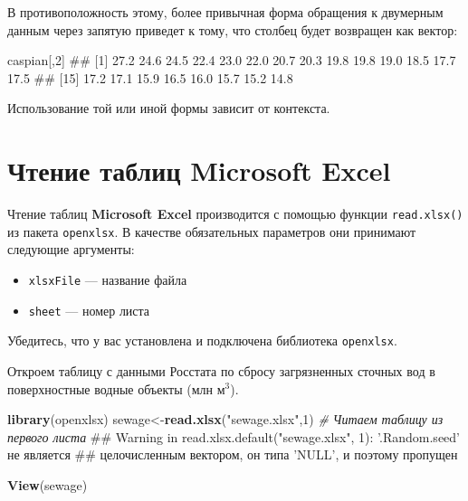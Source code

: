\documentclass[]{book}
\newenvironment{Shaded}{\begin{snugshade}}{\end{snugshade}}
\newcommand{\KeywordTok}[1]{\textcolor[rgb]{0.13,0.29,0.53}{\textbf{#1}}}
\newcommand{\DecValTok}[1]{\textcolor[rgb]{0.00,0.00,0.81}{#1}}
\newcommand{\StringTok}[1]{\textcolor[rgb]{0.31,0.60,0.02}{#1}}
\newcommand{\CommentTok}[1]{\textcolor[rgb]{0.56,0.35,0.01}{\textit{#1}}}
\newcommand{\NormalTok}[1]{#1}
\providecommand{\tightlist}{%
  \setlength{\itemsep}{0pt}\setlength{\parskip}{0pt}}
\begin{document}
В противоположность этому, более привычная форма обращения к двумерным
данным через запятую приведет к тому, что столбец будет возвращен как
вектор:

\begin{Shaded}
\begin{Highlighting}[]
\NormalTok{caspian[,}\DecValTok{2}\NormalTok{]}
\NormalTok{##  [1] 27.2 24.6 24.5 22.4 23.0 22.0 20.7 20.3 19.8 19.8 19.0 18.5 17.7 17.5}
\NormalTok{## [15] 17.2 17.1 15.9 16.5 16.0 15.7 15.2 14.8}
\end{Highlighting}
\end{Shaded}

Использование той или иной формы зависит от контекста.

\section{Чтение таблиц Microsoft Excel}\label{excel_reading}

Чтение таблиц \textbf{Microsoft Excel} производится с помощью функции
\texttt{read.xlsx()} из пакета \texttt{openxlsx}. В качестве
обязательных параметров они принимают следующие аргументы:

\begin{itemize}
\tightlist
\item
  \texttt{xlsxFile} --- название файла
\item
  \texttt{sheet} --- номер листа
\end{itemize}

Убедитесь, что у вас установлена и подключена библиотека
\texttt{openxlsx}.

Откроем таблицу с данными Росстата по сбросу загрязненных сточных вод в
поверхностные водные объекты (млн м\(^3\)).

\begin{Shaded}
\begin{Highlighting}[]
\KeywordTok{library}\NormalTok{(openxlsx)}
\NormalTok{sewage<-}\KeywordTok{read.xlsx}\NormalTok{(}\StringTok{"sewage.xlsx"}\NormalTok{,}\DecValTok{1}\NormalTok{) }\CommentTok{# Читаем таблицу из первого листа}
\NormalTok{## Warning in read.xlsx.default("sewage.xlsx", 1): '.Random.seed' не является}
\NormalTok{## целочисленным вектором, он типа 'NULL', и поэтому пропущен}
\end{Highlighting}
\end{Shaded}

\begin{Shaded}
\begin{Highlighting}[]
\KeywordTok{View}\NormalTok{(sewage)}
\end{Highlighting}
\end{Shaded}
\end{document}
